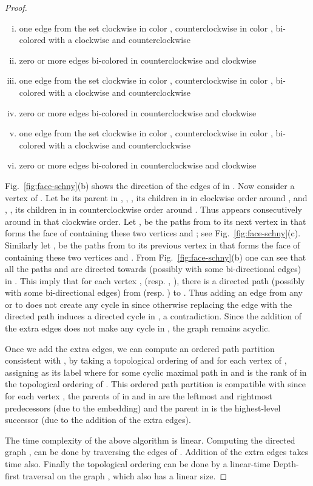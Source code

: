 \documentclass{article}
\begin{document}
\begin{proof}
\begin{enumerate}[(i)]
	\item one edge from the set {clockwise in color , counterclockwise in color , bi-colored with
		a clockwise  and counterclockwise }
	\item zero or more edges bi-colored in counterclockwise  and clockwise 
	\item one edge from the set {clockwise in color , counterclockwise in color , bi-colored with
		a clockwise  and counterclockwise }
	\item zero or more edges bi-colored in counterclockwise  and clockwise 
	\item one edge from the set {clockwise in color , counterclockwise in color , bi-colored with
		a clockwise  and counterclockwise }
	\item zero or more edges bi-colored in counterclockwise  and clockwise 

\end{enumerate}


Fig.~\ref{fig:face-schny}(b) shows the direction of the edges of  in . Now consider a vertex 
 of . Let  be its parent in , , ,  its children in  in clockwise order
 around , and , ,  its children in  in counterclockwise order around .
 Thus  appears consecutively around  in that clockwise order.
 Let ,  be the paths from  to its next vertex in  that forms the face of 
 containing these two vertices and ; see Fig.~\ref{fig:face-schny}(c). Similarly let ,  be the paths from  to its previous vertex in  that forms the face of  containing these two
 vertices and . From Fig.~\ref{fig:face-schny}(b) one can see that all the paths  and 
 are directed towards  (possibly with some bi-directional edges) in . This imply that for each
 vertex ,  (resp. , ), there is a directed path (possibly with some
 bi-directional edges) from  (resp. ) to . Thus adding an edge from any  or  to 
 does not create any cycle in  since otherwise replacing the edge with the directed path induces
 a directed cycle in , a contradiction. Since the addition of the
 extra edges does not make any cycle in , the graph  remains acyclic.



Once we add the extra edges, we can compute an ordered path partition consistent with , by taking a
 topological ordering of  and for each vertex  of , assigning  as its label
 where  for some cyclic maximal path  in  and  is the rank of  in the
 topological ordering of . This ordered path partition is compatible with  since
 for each vertex , the parents of  in  and in  are the leftmost and rightmost
 predecessors (due to the embedding) and the parent in  is the highest-level successor
 (due to the addition of the extra edges).


The time complexity of the above algorithm is linear. Computing the directed graph , 
 can be done by traversing the edges of . Addition of the extra
 edges takes  time also. Finally the topological ordering can be
 done by a linear-time Depth-first traversal on the graph , which also has a linear size.
\end{proof}
\end{document}
